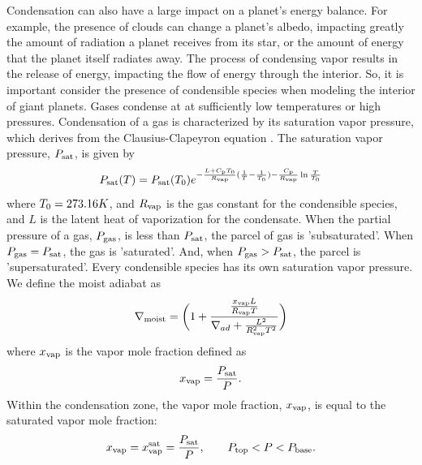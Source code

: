\documentclass[11pt]{ucscthesisbs}
\begin{document}
Condensation can also have a large impact on a planet's energy balance. For example, the presence of clouds can change a planet's albedo, impacting greatly the amount of radiation a planet receives from its star, or the amount of energy that the planet itself radiates away. The process of condensing vapor results in the release of energy, impacting the flow of energy through the interior. So, it is important consider the presence of condensible species when modeling the interior of giant planets. Gases condense at at sufficiently low temperatures or high pressures. Condensation of a gas is characterized by its saturation vapor pressure, which derives from the Clausius-Clapeyron equation \citep{sanchez_2011}. The saturation vapor pressure, $P_{\rm sat}$, is given by 
\begin{equation}
  P_{\rm sat}(T) = P_{\rm sat}(T_{\rm 0})e^{-\frac{L + C_{\rm p}T_{\rm 0}}{R_{\rm vap}}(\frac{1}{T} - \frac{1}{T_{\rm 0}}) -\frac{C_{\rm p}}{R_{\rm vap}}\ln{\frac{T}{T_{\rm 0}}}}
  \label{eq:saturation_vapor_pressure}
\end{equation}
where $T_{\rm 0} = 273.16K$, and $R_{\rm vap}$ is the gas constant for the condensible species, and $L$ is the latent heat of vaporization for the condensate. When the partial pressure of a gas, $P_{\rm gas}$, is less than $P_{\rm sat}$, the parcel of gas is 'subsaturated'. When $P_{\rm gas} = P_{\rm sat}$, the gas is 'saturated'. And, when $P_{\rm gas} > P_{\rm sat}$, the parcel is 'supersaturated'. Every condensible species has its own saturation vapor pressure. We define the moist adiabat as \citep{sanchez_2011} 
\begin{equation}
  \nabla_{\rm moist} = \bigg(1 + \frac{\frac{x_{\rm vap} L}{R_{\rm vap}T}}{\nabla_{ad} + \frac{L^2}{R_{\rm vap}^2 T^2}} \bigg)
\end{equation}
where $x_{\rm vap}$ is the vapor mole fraction defined as
\begin{equation}
x_{\rm vap} =\frac{P_{\rm sat}}{P}.
\end{equation}
Within the condensation zone, the vapor mole fraction, $x_{\rm vap}$, is equal to the saturated vapor mole fraction:
\begin{equation}
x_{\rm vap} = x_{\rm vap}^{\rm sat} = \frac{P_{\rm sat}}{P}, \qquad P_{\rm top} < P < P_{\rm base}.
\end{equation}
\end{document}
